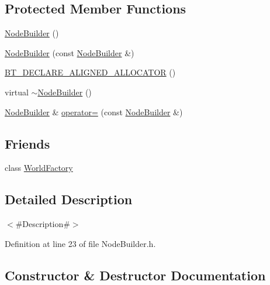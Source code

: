 \subsection*{Protected Member Functions}
\begin{DoxyCompactItemize}
\item 
\mbox{\hyperlink{classnjli_1_1_node_builder_ab75203c2f9b4fd4627f09ae95850ad44}{Node\+Builder}} ()
\item 
\mbox{\hyperlink{classnjli_1_1_node_builder_a542b69de918f40fbab7d6033ed8bccf7}{Node\+Builder}} (const \mbox{\hyperlink{classnjli_1_1_node_builder}{Node\+Builder}} \&)
\item 
\mbox{\hyperlink{classnjli_1_1_node_builder_a6f4f999e27919f671c9c68c6dd57f46f}{B\+T\+\_\+\+D\+E\+C\+L\+A\+R\+E\+\_\+\+A\+L\+I\+G\+N\+E\+D\+\_\+\+A\+L\+L\+O\+C\+A\+T\+OR}} ()
\item 
virtual \mbox{\hyperlink{classnjli_1_1_node_builder_a94ce9eced35d6f8009a9c46c515a970e}{$\sim$\+Node\+Builder}} ()
\item 
\mbox{\hyperlink{classnjli_1_1_node_builder}{Node\+Builder}} \& \mbox{\hyperlink{classnjli_1_1_node_builder_a4ce9324fccffdfad8eb10545bcce1cdf}{operator=}} (const \mbox{\hyperlink{classnjli_1_1_node_builder}{Node\+Builder}} \&)
\end{DoxyCompactItemize}
\subsection*{Friends}
\begin{DoxyCompactItemize}
\item 
class \mbox{\hyperlink{classnjli_1_1_node_builder_acb96ebb09abe8f2a37a915a842babfac}{World\+Factory}}
\end{DoxyCompactItemize}


\subsection{Detailed Description}
$<$\#\+Description\#$>$ 

Definition at line 23 of file Node\+Builder.\+h.



\subsection{Constructor \& Destructor Documentation}
\mbox{\label{classnjli_1_1_node_builder_ab75203c2f9b4fd4627f09ae95850ad44}} 

